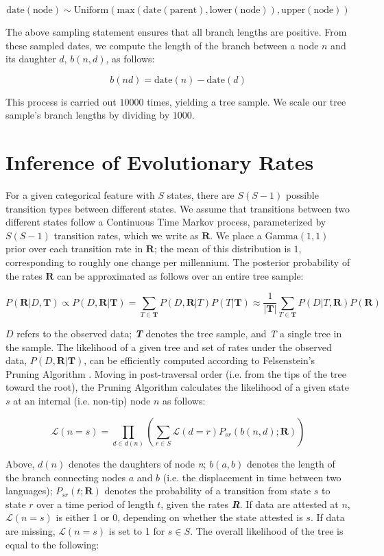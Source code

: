\documentclass[12pt]{article}
\begin{document}
\begin{appendices}
$$
\text{date}(\text{node}) \sim \text{Uniform}(\text{max}(\text{date}(\text{parent}),\text{lower}(\text{node})),\text{upper}(\text{node}))
$$

The above sampling statement ensures that all branch lengths are positive. From these sampled dates, we compute the length of the branch between a node $n$ and its daughter $d$, $b(n,d)$, as follows:

$$
b(nd) = \text{date}(n) - \text{date}(d)
$$

This process is carried out $10000$ times, yielding a tree sample. We scale our tree sample's branch lengths by dividing by $1000$.

\section{Inference of Evolutionary Rates}

For a given categorical feature with $S$ states, there are $S(S-1)$ possible transition types between different states. We assume that transitions between two different states follow a Continuous Time Markov process, parameterized by $S(S-1)$ transition rates, which we write as $\mathbf{R}$. We place a $\text{Gamma}(1,1)$ prior over each transition rate in $\mathbf{R}$; the mean of this distribution is $1$, corresponding to roughly one change per millennium. The posterior probability of the rates  $\mathbf{R}$ can be approximated as follows over an entire tree sample:

$$
P(\mathbf{R}|D,\mathbf{T}) \propto P(D,\mathbf{R}|\mathbf{T}) = \sum_{T \in \mathbf{T}} P(D,\mathbf{R}|T) P(T|\boldsymbol T) \approx \frac{1}{|\boldsymbol T|} \sum_{T \in \boldsymbol T} P(D|T,\mathbf{R}) P(\mathbf{R})
$$

$D$ refers to the observed data; \textbf{\emph{T}} denotes the tree sample, and \emph{T} a single tree in the sample. The likelihood of a given tree and set of rates under the observed data, $P(D,\mathbf{R}|\mathbf{T})$, can be efficiently computed according to Felsenstein's Pruning Algorithm \citep{Felsenstein1981}. Moving in post-traversal order (i.e. from the tips of the tree toward the root), the Pruning Algorithm calculates the likelihood of a given state $s$ at an internal (i.e. non-tip) node $n$ as follows:

$$
\mathcal{L}(n=s) = \prod_{d \in d(n)} \left ( \sum_{r \in S} \mathcal{L} (d=r) P_{sr}(b(n,d);\mathbf{R}) \right )
$$

Above, $d(n)$ denotes the daughters of node \emph{n}; $b(a,b)$ denotes the length of the branch connecting nodes $a$ and $b$ (i.e. the displacement in time between two languages); 
$P_{sr}(t;\mathbf{R})$ denotes the probability of a transition from state $s$ to state $r$ over a time period of length $t$, given the rates \textbf{\emph{R}}. If data are attested at $n$, $\mathcal{L}(n=s)$ is either 1 or 0, depending on whether the state attested is $s$. If data are missing, $\mathcal{L}(n=s)$ is set to 1 for $s \in S$. The overall likelihood of the tree is equal to the following:


\end{appendices}
\end{document}
